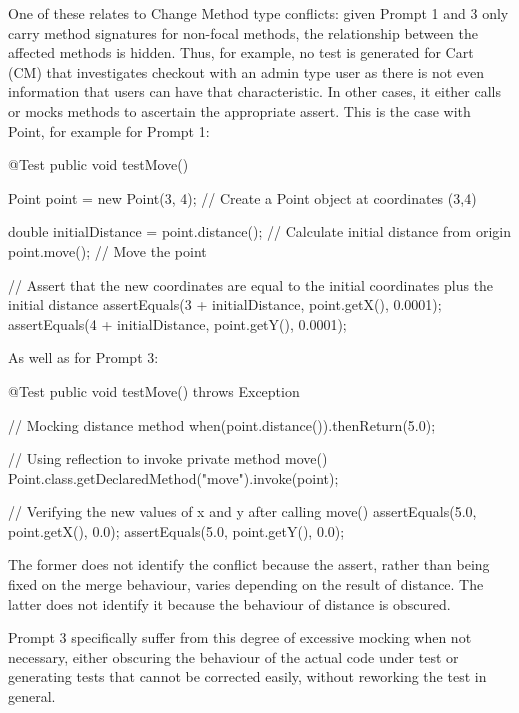 One of these relates to Change Method type conflicts: given Prompt 1 and 3 only carry method signatures for non-focal methods,
the relationship between the affected methods is hidden. Thus, for example, no test is generated for Cart (CM) that investigates
checkout with an admin type user as there is not even information that users can have that characteristic. In other cases, it either
calls or mocks methods to ascertain the appropriate assert. This is the case with Point, for example for Prompt 1:
\begin{response}
    @Test
    public void testMove() {
        Point point = new Point(3, 4); // Create a Point object at coordinates (3,4)

        double initialDistance = point.distance(); // Calculate initial distance from origin
        point.move(); // Move the point

        // Assert that the new coordinates are equal to the initial coordinates plus the initial distance
        assertEquals(3 + initialDistance, point.getX(), 0.0001);
        assertEquals(4 + initialDistance, point.getY(), 0.0001);
    }
\end{response}
As well as for Prompt 3:
\begin{response}
    @Test
    public void testMove() throws Exception {
        // Mocking distance method
        when(point.distance()).thenReturn(5.0);

        // Using reflection to invoke private method move()
        Point.class.getDeclaredMethod("move").invoke(point);

        // Verifying the new values of x and y after calling move()
        assertEquals(5.0, point.getX(), 0.0);
        assertEquals(5.0, point.getY(), 0.0);
    }
\end{response}
The former does not identify the conflict because the assert, rather than being fixed on the merge behaviour,
varies depending on the result of distance. The latter does not identify it because the behaviour of distance is
obscured.

Prompt 3 specifically suffer from this degree of excessive mocking when not necessary, either obscuring the behaviour of
the actual code under test or generating tests that cannot be corrected easily, without reworking the test in general.

